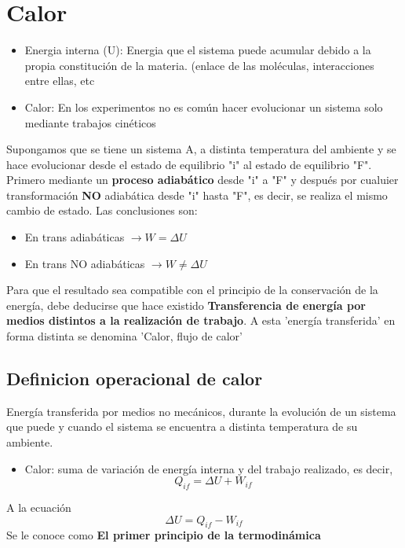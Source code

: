 \documentclass[12pt,twocolumn,a4paper]{report}
\begin{document}
\section*{Calor}
\begin{itemize}
\setlength\itemsep{0.001cm}
\item{Energia interna (U): Energia que el sistema puede acumular debido a la propia constitución de la materia. (enlace de las moléculas, interacciones entre ellas, etc}
\item{Calor: En los experimentos no es común hacer evolucionar un sistema solo mediante trabajos cinéticos}
\end{itemize}
Supongamos que se tiene un sistema A, a distinta temperatura del ambiente y se hace evolucionar desde el estado de equilibrio "i" al estado de equilibrio "F". Primero mediante un \textbf{proceso adiabático} desde "i" a "F" y después por cualuier transformación \textbf{NO} adiabática desde "i" hasta "F", es decir, se realiza el mismo cambio de estado. Las conclusiones son:
\begin{itemize}
\setlength\itemsep{0.001cm}
\item{En trans adiabáticas $\rightarrow W = \Delta U$}
\item{En trans NO adiabáticas $\rightarrow W \neq \Delta U$}
\end{itemize} 
Para que el resultado sea compatible con el principio de la conservación de la energía, debe deducirse que hace existido \textbf{Transferencia de energía por medios distintos a la realización de trabajo}. 
A esta 'energía transferida' en forma distinta se denomina 'Calor, flujo de calor' 
\subsection*{Definicion operacional de calor}
Energía transferida por medios no mecánicos, durante la evolución de un sistema que puede y cuando el sistema se encuentra a distinta temperatura de su ambiente.

\begin{itemize}
\setlength\itemsep{0.001cm}
\item{Calor: suma de variación de energía interna y del trabajo realizado, es decir, 
\begin{equation*}
Q_{if} = \Delta U + W_{if}
\end{equation*}}
\end{itemize} 
A la ecuación 
\begin{equation*}
\Delta U = Q_{if} - W_{if}
\end{equation*}
Se le conoce como \textbf{El primer principio de la termodinámica}
\end{document}
